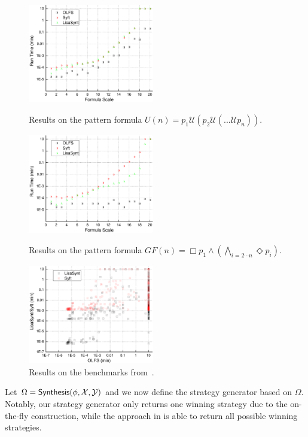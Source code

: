 \documentclass[letterpaper]{article} %
\newcommand{\U}{\mathcal{U}} \newcommand{\V}{\mathcal{V}} %
\newcommand{\F}{\Diamond} \newcommand{\G}{\Box}
\newcommand{\tool}{{\sf Synthesis}\xspace}
\begin{document}
\begin{figure}[ht!]
\begin{minipage}{0.33\linewidth}
\centering
\includegraphics[width=5.5cm]{pic1_1.pdf}
    \caption{Results on the pattern formula $U (n) = p_1\U(p_2\U(...\U p_n))$.}
    \label{fig:preprocess-1}
\end{minipage}%
\begin{minipage}{0.33\linewidth}
\centering
\includegraphics[width=5.5cm]{pic1_2.pdf}
    \caption{Results on the pattern formula $GF (n) = \G p_1\wedge(\bigwedge_{i=2\cdots n}\F p_i)$.}
    \label{fig:preprocess-2}
\end{minipage}%
\begin{minipage}{0.33\linewidth}
\centering
\includegraphics[width=5.5cm]{pic2.pdf}
    \caption{Results on the benchmarks from~\cite{BLTV20}.}
        \label{fig:otf}
\end{minipage}
\end{figure}

Let $\Omega = \tool (\phi, \X, \Y)$ and we now define the strategy generator based on $\Omega$. Notably, our strategy generator only returns one winning strategy due to the on-the-fly construction, while the approach in \cite{GV15} is able to return all possible winning strategies. 
\end{document}
